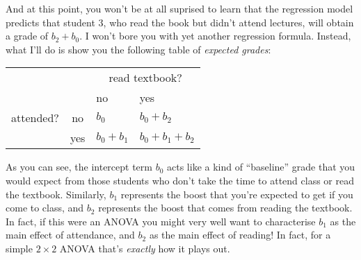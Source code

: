 And at this point, you won't be at all suprised to learn that the regression model predicts that student 3, who read the book but didn't attend lectures, will obtain a grade of $b_2 + b_0$. I won't bore you with yet another regression formula. Instead, what I'll do is show you the following table of {\it expected grades}:
\begin{center}
\begin{tabular}{cc|ll} 
& & \multicolumn{2}{c}{read textbook?} \\
& & no & yes \\ \hline
attended? & no & $b_0$ & $b_0 + b_2$ \\
& yes & $b_0 + b_1$ & $b_0 + b_1 + b_2$ 
\end{tabular}
\end{center} 
As you can see, the intercept term $b_0$ acts like a kind of ``baseline'' grade that you would expect from those students who don't take the time to attend class or read the textbook. Similarly, $b_1$ represents the boost that you're expected to get if you come to class, and $b_2$ represents the boost that comes from reading the textbook. In fact, if this were an ANOVA you might very well want to characterise $b_1$ as the main effect of attendance, and $b_2$ as the main effect of reading! In fact, for a simple $2 \times 2$ ANOVA that's {\it exactly} how it plays out. 

